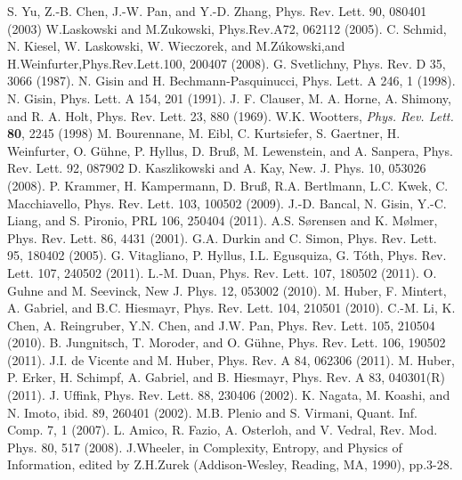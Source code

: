 \begin{thebibliography}{}
  S. Yu, Z.-B. Chen, J.-W. Pan, and Y.-D. Zhang, Phys. Rev. Lett. 90, 080401 (2003)
  W.Laskowski and M.Zukowski, Phys.Rev.A72, 062112 (2005).
  C. Schmid, N. Kiesel, W. Laskowski, W. Wieczorek, and M.Z\'ukowski,and H.Weinfurter,Phys.Rev.Lett.100, 200407 (2008).
  G. Svetlichny, Phys. Rev. D 35, 3066 (1987).
  N. Gisin and H. Bechmann-Pasquinucci, Phys. Lett. A 246, 1 (1998).
  N. Gisin, Phys. Lett. A 154, 201 (1991).
  J. F. Clauser, M. A. Horne, A. Shimony, and R. A. Holt, Phys. Rev. Lett. 23, 880 (1969).
  W.K. Wootters, \textit{Phys. Rev. Lett.} \textbf{80}, 2245 (1998)
  M. Bourennane, M. Eibl, C. Kurtsiefer, S. Gaertner, H. Weinfurter, O. G\"uhne, P. Hyllus, D. Bruß, M. Lewenstein, and A. Sanpera, Phys. Rev. Lett. 92, 087902
  D. Kaszlikowski and A. Kay, New. J. Phys. 10, 053026 (2008).
  P. Krammer, H. Kampermann, D. Bruß, R.A. Bertlmann, L.C. Kwek, C. Macchiavello, Phys. Rev. Lett. 103, 100502 (2009).
  J.-D. Bancal, N. Gisin, Y.-C. Liang, and S. Pironio, PRL 106, 250404 (2011).
  A.S. Sørensen and K. Mølmer, Phys. Rev. Lett. 86, 4431 (2001).
  G.A. Durkin and C. Simon, Phys. Rev. Lett. 95, 180402 (2005).
  G. Vitagliano, P. Hyllus, I.L. Egusquiza, G. T\'oth, Phys. Rev. Lett. 107, 240502 (2011).
  L.-M. Duan, Phys. Rev. Lett. 107, 180502 (2011).
  O. Guhne and M. Seevinck, New J. Phys. 12, 053002 (2010).
  M. Huber, F. Mintert, A. Gabriel, and B.C. Hiesmayr, Phys. Rev. Lett. 104, 210501 (2010).
  C.-M. Li, K. Chen, A. Reingruber, Y.N. Chen, and J.W. Pan, Phys. Rev. Lett. 105, 210504 (2010).
  B. Jungnitsch, T. Moroder, and O. G\"uhne, Phys. Rev. Lett. 106, 190502 (2011).
  J.I. de Vicente and M. Huber, Phys. Rev. A 84, 062306 (2011).
  M. Huber, P. Erker, H. Schimpf, A. Gabriel, and B. Hiesmayr, Phys. Rev. A 83, 040301(R) (2011).
  J. Uffink, Phys. Rev. Lett. 88, 230406 (2002).
 K. Nagata, M. Koashi, and N. Imoto, ibid. 89, 260401 (2002).
  M.B. Plenio and S. Virmani, Quant. Inf. Comp. 7, 1 (2007).
  L. Amico, R. Fazio, A. Osterloh, and V. Vedral, Rev. Mod. Phys. 80, 517 (2008).
  J.Wheeler, in Complexity, Entropy, and Physics of Information, edited by Z.H.Zurek (Addison-Wesley, Reading, MA, 1990), pp.3-28.

\end{thebibliography}
